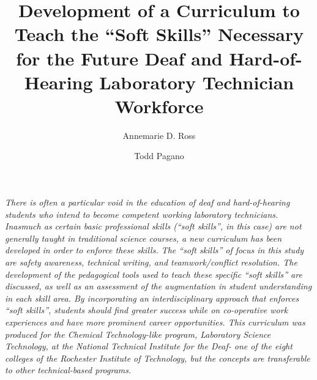 \documentclass[11.5pt]{sig-alternate} %
\makeatletter
\let\oldabstract\abstract
\let\oldendabstract\endabstract
\renewenvironment{abstract} %
{\renewenvironment{quotation}%
               {\list{}{\addtolength{\leftmargin}{1em} %
                        \listparindent 1.5em%
                        \itemindent    \listparindent%
                        \rightmargin   \leftmargin%
                        \parsep        \z@ \@plus\p@}%
                \item\relax}%
               {\endlist}%
\oldabstract}
{\oldendabstract}
\makeatother
\begin{document}
\title{Development of a Curriculum to Teach the “Soft Skills” Necessary for the Future Deaf and Hard-of-Hearing Laboratory Technician Workforce}

\author[1]{\large \color{blue}Annemarie D. Ross}
\author[1]{\large \color{blue}Todd Pagano}


\toappear{ }
\maketitle
\begin{@twocolumnfalse} 
\begin{abstract}
\item 
\textit{There is often a particular void in the education of deaf and hard-of-hearing students who intend to become competent working laboratory technicians. Inasmuch as certain basic professional skills (“soft skills”, in this case) are not generally taught in traditional science courses, a new curriculum has been developed in order to enforce these skills. The “soft skills” of focus in this study are safety awareness, technical writing, and teamwork/conflict resolution. The development of the pedagogical tools used to teach these specific “soft skills” are discussed, as well as an assessment of the augmentation in student understanding in each skill area. By incorporating an interdisciplinary approach that enforces “soft skills”, students should find greater success while on co-operative work experiences and have more prominent career opportunities. This curriculum was produced for the Chemical Technology-like program, Laboratory Science Technology, at the National Technical Institute for the Deaf- one of the eight colleges of the Rochester Institute of Technology, but the concepts are transferable to other technical-based programs.}
\\ \\ 
\end{abstract}
\end{@twocolumnfalse}

\end{document}
